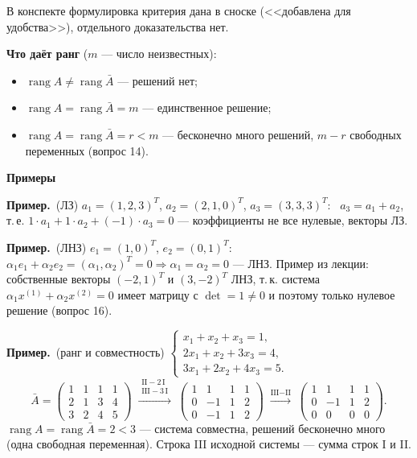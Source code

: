 \documentclass[a4paper,11pt]{article}
\DeclareMathOperator{\rang}{rang}
\newcommand{\gauss}[1]{\;\xrightarrow{\scriptstyle #1}\;}
\newcommand{\prim}{\par\smallskip\noindent\textbf{\textcolor{teoc!80!black}{Пример.}}\ }
\newcommand{\podr}[1]{\par\needspace{8\baselineskip}\medskip
  {\large\bfseries\textcolor{oprc!80!black}{#1}}\par\nopagebreak\smallskip}
\begin{document}
{\small\textcolor{zamc}{В конспекте формулировка критерия дана в сноске (<<добавлена для удобства>>), отдельного доказательства нет.}}

\textbf{Что даёт ранг} ($m$ --- число неизвестных):
\begin{itemize}[leftmargin=*]
  \item $\rang A \ne \rang \bar A$ --- решений нет;
  \item $\rang A = \rang \bar A = m$ --- единственное решение;
  \item $\rang A = \rang \bar A = r < m$ --- бесконечно много решений, $m - r$ свободных переменных (вопрос 14).
\end{itemize}

\podr{Примеры}

\prim (ЛЗ) $a_1 = (1, 2, 3)^T$, $a_2 = (2, 1, 0)^T$, $a_3 = (3, 3, 3)^T$: \ $a_3 = a_1 + a_2$, т.\,е.
$1\cdot a_1 + 1\cdot a_2 + (-1)\cdot a_3 = 0$ --- коэффициенты не все нулевые, векторы ЛЗ.

\prim (ЛНЗ) $e_1 = (1, 0)^T$, $e_2 = (0, 1)^T$: \ $\alpha_1 e_1 + \alpha_2 e_2 = (\alpha_1, \alpha_2)^T = 0 \Rightarrow \alpha_1 = \alpha_2 = 0$ --- ЛНЗ.
Пример из лекции: собственные векторы $(-2, 1)^T$ и $(3, -2)^T$ ЛНЗ, т.\,к. система $\alpha_1 x^{(1)} + \alpha_2 x^{(2)} = 0$
имеет матрицу с $\det = 1 \ne 0$ и поэтому только нулевое решение (вопрос 16).

\prim (ранг и совместность) $\begin{cases} x_1 + x_2 + x_3 = 1, \\ 2x_1 + x_2 + 3x_3 = 4, \\ 3x_1 + 2x_2 + 4x_3 = 5. \end{cases}$
\[
  \bar A = \left(\begin{array}{rrr|r} 1 & 1 & 1 & 1 \\ 2 & 1 & 3 & 4 \\ 3 & 2 & 4 & 5 \end{array}\right)
  \gauss{\substack{\text{II} - 2\,\text{I} \\ \text{III} - 3\,\text{I}}}
  \left(\begin{array}{rrr|r} 1 & 1 & 1 & 1 \\ 0 & -1 & 1 & 2 \\ 0 & -1 & 1 & 2 \end{array}\right)
  \gauss{\text{III} - \text{II}}
  \left(\begin{array}{rrr|r} 1 & 1 & 1 & 1 \\ 0 & -1 & 1 & 2 \\ 0 & 0 & 0 & 0 \end{array}\right).
\]
$\rang A = \rang \bar A = 2 < 3$ --- система совместна, решений бесконечно много (одна свободная переменная).
Строка III исходной системы --- сумма строк I и II.
\end{document}
